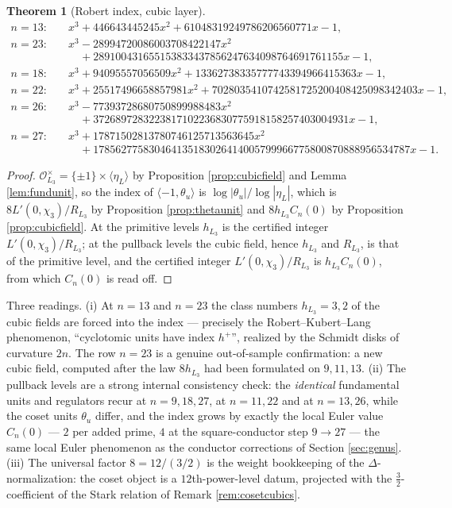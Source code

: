 \documentclass[11pt]{amsart}
\numberwithin{equation}{section}
\theoremstyle{plain}
\newtheorem{theorem}{Theorem}[section]
\theoremstyle{definition}
\theoremstyle{remark}
\newcommand{\Oc}{\mathcal{O}}
\begin{document}
\begin{theorem}[Robert index, cubic layer]
{\begin{align*}
n = 13:&\quad x^3 + 446643445245x^2 + 61048319249786206560771x - 1,\\
n = 23:&\quad x^3 - 28994720086003708422147x^2\\
      &\qquad + 289100431655153833437856247634098764691761155x - 1,\\
n = 18:&\quad x^3 + 94095557056509x^2 + 13362738335777743394966415363x - 1,\\
n = 22:&\quad x^3 + 25517496658857981x^2
      + 7028035410742581725200408425098342403x - 1,\\
n = 26:&\quad x^3 - 77393728680750899988483x^2\\
      &\qquad + 3726897283223817102236830775918158257403004931x - 1,\\
n = 27:&\quad x^3 + 17871502813780746125713563645x^2\\
      &\qquad + 178562775830464135183026414005799966775800870888956534787x - 1 .
\end{align*}}
\end{theorem}

\begin{proof}
$\Oc_{L_3}^\times = \{\pm1\}\times\langle\eta_L\rangle$ by Proposition
\ref{prop:cubicfield} and Lemma \ref{lem:fundunit}, so the index of
$\langle -1, \theta_u\rangle$ is $\log|\theta_u|/\log|\eta_L|$, which is
$8L'(0,\chi_3)/R_{L_3}$ by Proposition \ref{prop:thetaunit} and
$8h_{L_3}C_n(0)$ by Proposition \ref{prop:cubicfield}.  At the primitive
levels $h_{L_3}$ is the certified integer $L'(0,\chi_3)/R_{L_3}$; at the
pullback levels the cubic field, hence $h_{L_3}$ and $R_{L_3}$, is that
of the primitive level, and the certified integer $L'(0,\chi_3)/R_{L_3}$
is $h_{L_3}C_n(0)$, from which $C_n(0)$ is read off.
\end{proof}

Three readings.  (i) At $n = 13$ and $n = 23$ the class numbers $h_{L_3}
= 3, 2$ of the cubic fields are forced into the index --- precisely the
Robert--Kubert--Lang phenomenon, ``cyclotomic units have index $h^+$'',
realized by the Schmidt disks of curvature $2n$.  The row $n = 23$ is a
genuine out-of-sample confirmation: a new cubic field, computed after
the law $8h_{L_3}$ had been formulated on $9, 11, 13$.  (ii) The pullback
levels are a strong internal consistency check: the \emph{identical}
fundamental units and regulators recur at $n = 9, 18, 27$, at $n = 11,
22$ and at $n = 13, 26$, while the coset units $\theta_u$ differ, and the
index grows by exactly the local Euler value $C_n(0)$ --- $2$ per added
prime, $4$ at the square-conductor step $9 \to 27$ --- the same local
Euler phenomenon as the conductor corrections of Section
\ref{sec:genus}.  (iii) The universal factor $8 = 12/(3/2)$ is the weight
bookkeeping of the $\Delta$-normalization: the coset object is a
$12$th-power-level datum, projected with the $\tfrac32$-coefficient of
the Stark relation of Remark \ref{rem:cosetcubics}.
\end{document}
